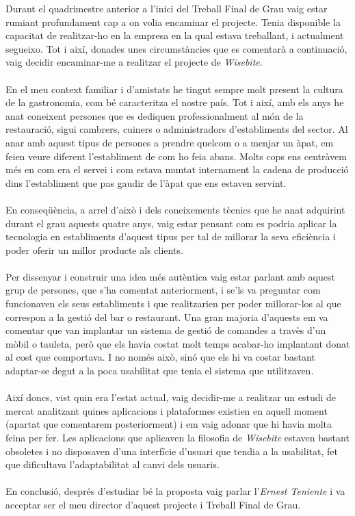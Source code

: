 Durant el quadrimestre anterior a l'inici del Treball Final de Grau vaig estar rumiant profundament cap a on volia encaminar el projecte. Tenia disponible la capacitat de realitzar-ho en la empresa en la qual estava treballant, i actualment segueixo. Tot i així, donades unes circumstàncies que es comentarà a continuació, vaig decidir encaminar-me a realitzar el projecte de \textit{Wisebite}.
\\\\
En el meu context familiar i d'amistats he tingut sempre molt present la cultura de la gastronomia, com bé caracteritza el nostre país. Tot i així, amb els anys he anat coneixent persones que es dediquen professionalment al món de la restauració, sigui cambrers, cuiners o administradors d'establiments del sector. Al anar amb aquest tipus de persones a prendre quelcom o a menjar un àpat, em feien veure diferent l'establiment de com ho feia abans. Molts cops ens centràvem més en com era el servei i com estava muntat internament la cadena de producció dins l'establiment que pas gaudir de l'àpat que ens estaven servint.
\\\\
En conseqüència, a arrel d'això i dels coneixements tècnics que he anat adquirint durant el grau aquests quatre anys, vaig estar pensant com es podria aplicar la tecnologia en establiments d'aquest tipus per tal de millorar la seva eficiència i poder oferir un millor producte als clients.
\\\\
Per dissenyar i construir una idea més autèntica vaig estar parlant amb aquest grup de persones, que s'ha comentat anteriorment, i se'ls va preguntar com funcionaven els seus establiments i que realitzarien per poder millorar-los al que correspon a la gestió del bar o restaurant. Una gran majoria d'aquests em va comentar que van implantar un sistema de gestió de comandes a travès d'un mòbil o tauleta, però que els havia costat molt temps acabar-ho implantant donat al cost que comportava. I no només això, sinó que els hi va costar bastant adaptar-se degut a la poca usabilitat que tenia el sistema que utilitzaven.
\\\\
Així doncs, vist quin era l'estat actual, vaig decidir-me a realitzar un estudi de mercat analitzant quines aplicacions i plataformes existien en aquell moment (apartat que comentarem posteriorment) i em vaig adonar que hi havia molta feina per fer. Les aplicacions que aplicaven la filosofia de \textit{Wisebite} estaven bastant obsoletes i no disposaven d'una interfície d'usuari que tendia a la usabilitat, fet que dificultava l'adaptabilitat al canvi dels usuaris.
\\\\
En conclusió, després d'estudiar bé la proposta vaig parlar l'\textit{Ernest Teniente} i va acceptar ser el meu director d'aquest projecte i Treball Final de Grau.